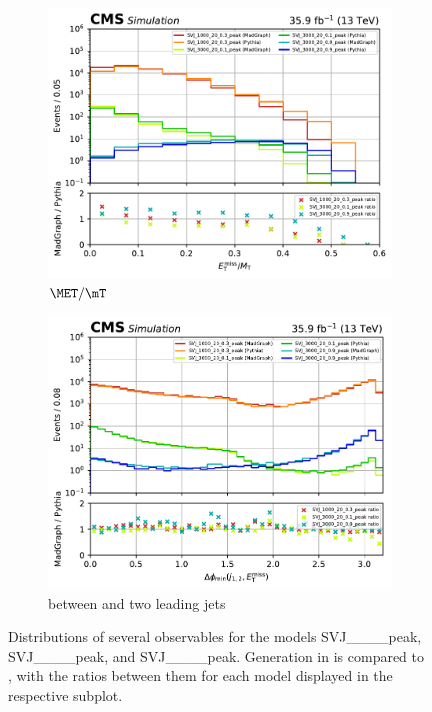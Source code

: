 \begin{figure}[htbp]
    \begin{subfigure}[b]{0.48\textwidth}
        \includegraphics[width=\textwidth]{figures/madgraph_pythia_comparisons/with_ratios/part1/met_over_mt.pdf}
        \caption{$\MET/\mT$}
    \end{subfigure}
    \hfill
    \begin{subfigure}[b]{0.48\textwidth}
        \includegraphics[width=\textwidth]{figures/madgraph_pythia_comparisons/with_ratios/part1/min_dphi.pdf}
        \caption{\mindphi between \MET and two leading \glspl{jet}}
    \end{subfigure}
    \caption[Distributions of several observables for the models SVJ\_\_\_\_\-peak, SVJ\_\_\_\_\-peak, and SVJ\_\_\_\_\-peak]{Distributions of several observables for the models SVJ\_\_\_\_\-peak, SVJ\_\_\_\_\-peak, and SVJ\_\_\_\_\-peak. Generation in \MGvATNLO is compared to \PYTHIAEIGHT, with the ratios between them for each model displayed in the respective subplot.}
    \label{fig:svj_mg_pythia_comparison_set1}
\end{figure}

